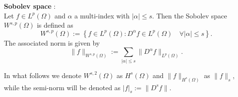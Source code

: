 {\begin{definition} \label{SobolevSpace}
  \textbf{Sobolev space} \cite{Ciarlet}: \\
  Let $f \in L^p(\Omega)$ and $\alpha$ a multi-index with $|\alpha| \le s$. Then
  the Sobolev space $W^{s,p}(\Omega)$ is defined as
  \begin{equation}
    W^{s,p}(\Omega) := \left\{ f\in L^p(\Omega) : D^{\alpha} f \in
      L^p(\Omega)\quad \forall |\alpha| \le s\right\}.
    \label{eqn:Sobolev}
  \end{equation}
  The associated norm is given by
  \begin{equation}
    \|f\|_{W^{s,p}(\Omega)} := \sum_{|\alpha|\le s}
      \|D^{\alpha}f\|_{L^p(\Omega)}.
    \label{eqn:HkpNorm}
  \end{equation}
\end{definition}
In what follows we denote $W^{s,2}(\Omega)$ as $H^s(\Omega)$ and
$\|f\|_{H^s(\Omega)}$ as $\|f\|_s$, while the semi-norm will be denoted
as $|f|_s := \|D^s f\|$.}

